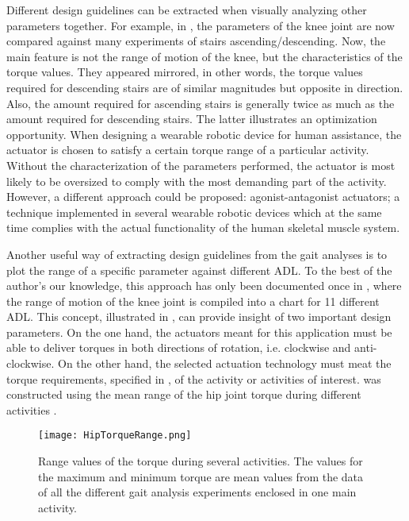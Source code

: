 Different design guidelines can be extracted when visually analyzing other parameters together. For example, in  , the parameters of the knee joint are now compared against many experiments of stairs ascending/descending. Now, the main feature is not the range of motion of the knee, but the characteristics of the torque values. They appeared mirrored, in other words, the torque values required for descending stairs are of similar magnitudes but opposite in direction. Also, the amount required for ascending stairs is generally twice as much as the amount required for descending stairs. The latter illustrates an optimization opportunity. When designing a wearable robotic device for human assistance, the actuator is chosen to satisfy a certain torque range of a particular activity. Without the characterization of the parameters performed, the actuator is most likely to be oversized to comply with the most demanding part of the activity. However, a different approach could be proposed: agonist-antagonist actuators; a technique implemented in several wearable robotic devices which at the same time complies with the actual functionality of the human skeletal muscle system.

Another useful way of extracting design guidelines from the gait analyses is to plot the range of a specific parameter against different ADL. To the best of the author's our knowledge, this approach has only been documented once in \cite{rowe2000knee}, where the range of motion of the knee joint is compiled into a chart for 11 different ADL. This concept, illustrated in , can provide insight of two important design parameters. On the one hand, the actuators meant for this application must be able to deliver torques in both directions of rotation, i.e. clockwise and anti-clockwise. On the other hand, the selected actuation technology must meat the torque requirements, specified in , of the activity or activities of interest.  was constructed using the mean range of the hip joint torque during different activities \cite{bovi2011multiple,lee2008biomechanics,han2011biomechanical,protopapadaki2007hip,riener2002stair,mcintosh2006gait,roebroeck1994biomechanics,mak2003joint}.

\begin{figure}[htbp!]
    \centering
    \texttt{[image: HipTorqueRange.png]}
    \caption{Range values of the torque during several activities. The values for the maximum and minimum torque are mean values from the data of all the different gait analysis experiments enclosed in one main activity. \cite{bovi2011multiple,lee2008biomechanics,han2011biomechanical,protopapadaki2007hip,riener2002stair,mcintosh2006gait,roebroeck1994biomechanics,mak2003joint,solis2017characterization} }
    \label{fig:HipTorqueRange}
\end{figure}

